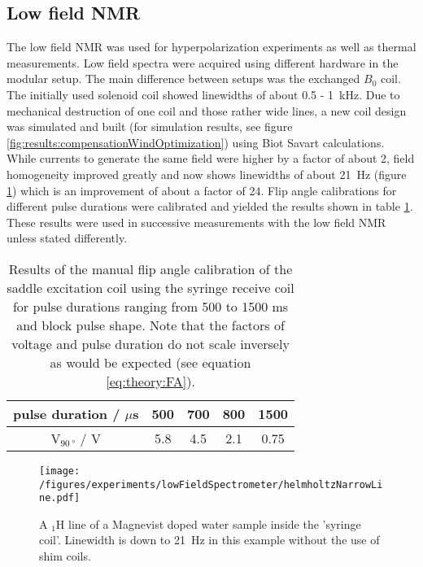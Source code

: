     \subsection{Low field NMR}
    \label{chap:results:lowFieldNMR}
    The low field NMR was used for hyperpolarization experiments as well as thermal measurements. Low field spectra were acquired using different hardware in the modular setup. The main difference between setups was the exchanged $B_0$ coil. The initially used solenoid coil showed linewidths of about 0.5 - \SI{1}{\kilo\hertz}. Due to mechanical destruction of one coil and those rather wide lines, a new coil design was simulated and built (for simulation results, see figure \ref{fig:results:compensationWindOptimization}) using Biot Savart calculations. While currents to generate the same field were higher by a factor of about 2, field homogeneity improved greatly and now shows linewidths of about \SI{21}{\hertz} (figure \ref{results:lowFieldSpectrometer:thinLine}) which is an improvement of about a factor of 24. Flip angle calibrations for different pulse durations were calibrated and yielded the results shown in table \ref{table:results:FA}. These results were used in successive measurements with the low field NMR unless stated differently.
        \begin{table}
            \centering
            \begin{tabular}{|c|cccc|}
            \hline
            pulse duration / $\mu$s & 500 & 700 &  800 & 1500 \\
            \hline
            $\mathrm{V}_{\SI{90}{\degree}}$ / V & 5.8 & 4.5 &  2.1&  0.75 \\
            \hline
            \end{tabular} 
            \caption[Flip angle calibration results]{Results of the manual flip angle calibration of the saddle excitation coil using the syringe receive coil for pulse durations ranging from 500 to 1500 ms and block pulse shape. Note that the factors of voltage and pulse duration do not scale inversely as would be expected (see equation \ref{eq:theory:FA}).}
            \label{table:results:FA}
        \end{table}
            \begin{figure}
                \centering
                \texttt{[image: /figures/experiments/lowFieldSpectrometer/helmholtzNarrowLine.pdf]}
                \caption[Thin line helmholtz coils]{A $_1\mathrm{H}$ line of a Magnevist doped water sample inside the 'syringe coil'. Linewidth is down to \SI{21}{\hertz} in this example without the use of shim coils.}
                \label{results:lowFieldSpectrometer:thinLine}
            \end{figure}

